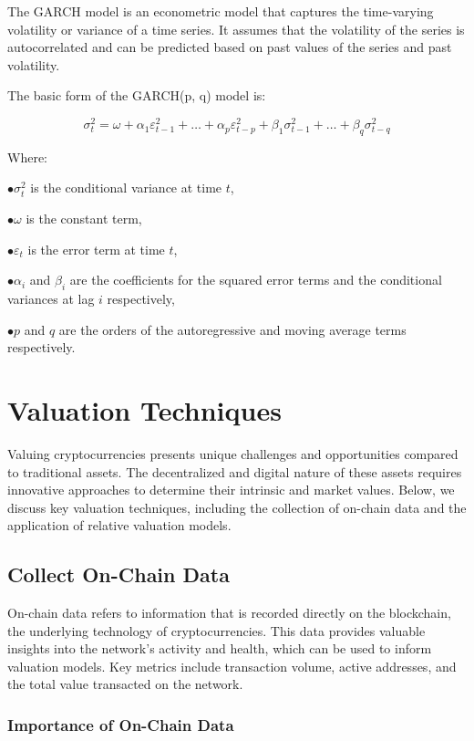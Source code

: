 \documentclass{ledger}
\begin{document}
The GARCH model is an econometric model that captures the time-varying volatility or variance of a time series. It assumes that the volatility of the series is autocorrelated and can be predicted based on past values of the series and past volatility.

The basic form of the GARCH(p, q) model is:

\[
\sigma_{t}^2 = \omega + \alpha_{1}\varepsilon_{t-1}^2 + \ldots + \alpha_{p}\varepsilon_{t-p}^2 + \beta_{1}\sigma_{t-1}^2 + \ldots + \beta_{q}\sigma_{t-q}^2
\]

Where:

$ \bullet \sigma_{t}^2 $ is the conditional variance at time $ t $,

$ \bullet \omega $ is the constant term,

$ \bullet \varepsilon_{t} $ is the error term at time $ t $,

$ \bullet \alpha_{i} $ and $ \beta_{i} $ are the coefficients for the squared error terms and the conditional variances at lag $ i $ respectively,

$ \bullet p $ and $ q $ are the orders of the autoregressive and moving average terms respectively.


\section{Valuation Techniques}

Valuing cryptocurrencies presents unique challenges and opportunities compared to traditional assets. The decentralized and digital nature of these assets requires innovative approaches to determine their intrinsic and market values. Below, we discuss key valuation techniques, including the collection of on-chain data and the application of relative valuation models.

\subsection{Collect On-Chain Data}

On-chain data refers to information that is recorded directly on the blockchain, the underlying technology of cryptocurrencies. This data provides valuable insights into the network's activity and health, which can be used to inform valuation models. Key metrics include transaction volume, active addresses, and the total value transacted on the network.

\subsubsection{Importance of On-Chain Data}
\end{document}
